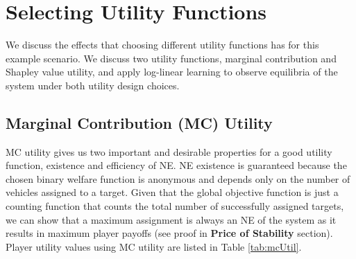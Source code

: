 \documentclass[11pt, onecolumn, compsoc, letterpaper]{article}
\begin{document}
\section{Selecting Utility Functions}
We discuss the effects that choosing different utility functions has for this example scenario. We discuss two utility functions, marginal contribution and Shapley value utility, and apply log-linear learning to observe equilibria of the system under both utility design choices.

\subsection{Marginal Contribution (MC) Utility}
MC utility gives us two important and desirable properties for a good utility function, existence and efficiency of NE. NE existence is guaranteed because the chosen binary welfare function is anonymous and  depends only on the number of vehicles assigned to a target\cite{Monderer1996}. Given that the global objective function is just a counting function that counts the total number of successfully assigned targets, we can show that a maximum assignment is always an NE of the system as it results in maximum player payoffs (see proof in \textbf{Price of Stability} section). Player utility values using MC utility are listed in Table \ref{tab:mcUtil}.  
\end{document}
